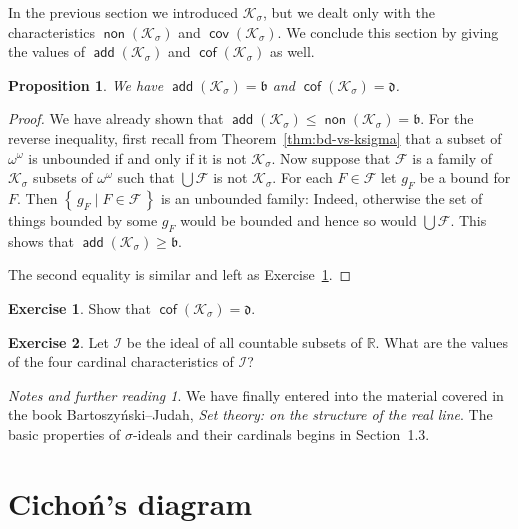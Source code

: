 \documentclass[11pt,oneside]{amsbook}
\newcommand{\set}[1]{\left\{\,#1\,\right\}}
\newcommand{\R}{\mathbb R}
\newcommand{\Ksigma}{\mathcal K_\sigma}
\DeclareMathOperator{\add}{\mathsf{add}}
\DeclareMathOperator{\non}{\mathsf{non}}
\DeclareMathOperator{\cov}{\mathsf{cov}}
\DeclareMathOperator{\cof}{\mathsf{cof}}
\theoremstyle{definition}
\newtheorem{exerc}{Exercise}[section]
\theoremstyle{plain}
\newtheorem{proposition}[theorem]{Proposition}
\theoremstyle{definition}
\theoremstyle{remark}
\newtheorem*{notes}{Notes and further reading}
\numberwithin{equation}{section}
\numberwithin{figure}{section}
\begin{document}
In the previous section we introduced $\Ksigma$, but we dealt only with the characteristics $\non(\Ksigma)$ and $\cov(\Ksigma)$. We conclude this section by giving the values of $\add(\Ksigma)$ and $\cof(\Ksigma)$ as well.

\begin{proposition}
  We have $\add(\Ksigma)=\mathfrak b$ and $\cof(\Ksigma)=\mathfrak d$.
\end{proposition}

\begin{proof}
  We have already shown that $\add(\Ksigma)\leq\non(\Ksigma)=\mathfrak b$. For the reverse inequality, first recall from Theorem~\ref{thm:bd-vs-ksigma} that a subset of $\omega^\omega$ is unbounded if and only if it is not $\Ksigma$. Now suppose that $\mathcal F$ is a family of $\Ksigma$ subsets of $\omega^\omega$ such that $\bigcup\mathcal F$ is not $\Ksigma$. For each $F\in\mathcal F$ let $g_F$ be a bound for $F$. Then $\set{g_F\mid F\in\mathcal F}$ is an unbounded family: Indeed, otherwise the set of things bounded by some $g_F$ would be bounded and hence so would $\bigcup\mathcal F$. This shows that $\add(\Ksigma)\geq\mathfrak b$.

The second equality is similar and left as Exercise~\ref{exerc:non-ksigma-d}.
\end{proof}

\begin{exerc}
  \label{exerc:non-ksigma-d}
  Show that $\cof(\Ksigma)=\mathfrak d$.
\end{exerc}

\begin{exerc}
  Let $\mathcal I$ be the ideal of all countable subsets of $\R$. What are the values of the four cardinal characteristics of $\mathcal I$?
\end{exerc}

\begin{notes}
  We have finally entered into the material covered in the book Bartoszy\'nski--Judah, \emph{Set theory: on the structure of the real line}. The basic properties of $\sigma$-ideals and their cardinals begins in Section~1.3.
\end{notes}


\newpage
\section{Cicho\'n's diagram}
\end{document}
